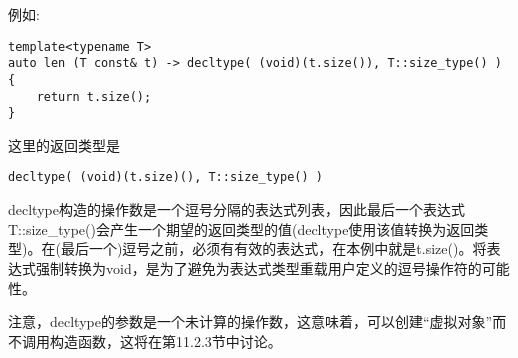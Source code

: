 例如:

\begin{lstlisting}[style=styleCXX]
template<typename T>
auto len (T const& t) -> decltype( (void)(t.size()), T::size_type() )
{
	return t.size();
}
\end{lstlisting}

这里的返回类型是

\begin{lstlisting}[style=styleCXX]
decltype( (void)(t.size)(), T::size_type() )
\end{lstlisting}

decltype构造的操作数是一个逗号分隔的表达式列表，因此最后一个表达式T::size\_type()会产生一个期望的返回类型的值(decltype使用该值转换为返回类型)。在(最后一个)逗号之前，必须有有效的表达式，在本例中就是t.size()。将表达式强制转换为void，是为了避免为表达式类型重载用户定义的逗号操作符的可能性。

注意，decltype的参数是一个未计算的操作数，这意味着，可以创建“虚拟对象”而不调用构造函数，这将在第11.2.3节中讨论。























